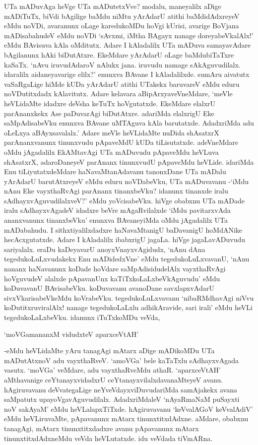 UTa mADuvAga heVge UTa mADutetxVve? modalu, maneyalilx aDige mADiTuTx, biVdi bAgilige baMdu niMtu yArAdarU atithi baMdidAdxreyeV eMdu noVDi, avaranunx oLage karedukoMDu hoVgi kUrisi, avarige BoVjana mADisabahudeV eMdu noVDi `sAvxmi, iMtha BAgayx nanage doreyabeVkalAlx!' eMdu BAvisuva kAla oMditutx. Adare I kAladalilx UTa mADuva samayavAdare bAgilanunx hAki biDutAtxre. EkeMdare yArAdarU oLage baMdubiTaTxre kaSaTx. `nAvu iruvudAdaroV nAlukx jana. iruvudu namage sAkAguvudilalx. idaralilx aidaneyavarige elilx?' enunxva BAvane I kAladalilxde. sumAru aivatutx vaSaRgaLige hiMde kUDa yArAdarU atithi UTakekx baruvareV eMdu eduru noVDutitxdadx kAlavitutx. Adare kelavara aBipArxyaveVneMdare, `meVle heVLidaMte idadxre deVsha keTuTx hoVgutatxde. EkeMdare elalxrU parAnanxkekx Ase paDuvarAgi biDutAtxre. adariMda elalxrigU Eke saMpAdisabeVku enunxva BAvane uMTAguva kAla barutatxde. AdadxriMda adu oLeLxya aBAyxsavalalx.' Adare meVle heVLidaMte nuDida shAsatxrX parAnanxvanunx tinunxvudu pApaveMdU kUDa tiLisutatxde. adeVneMdare oMdu jAgadalilx EkAMtavAgi UTa mADuvudu pApaveMdu heVLuva shAsatxrX, adaroDaneyeV parAnanx tinunxvudU pApaveMdu heVLide. idariMda Enu tiLiyutatxdeMdare haNavaMtanAdavanu tanonxDane UTa mADalu yArAdarU barutAtxreyeV eMdu eduru noVDabeVku, UTa mADuvavanu -`iMdu nAnu Eke vayxthaRvAgi parAnanx tinanxbeVku? idanunx tinanxde iralu sAdhayxvAguvudilalxveV?' eMdu yoVcisabeVku. hiVge obabxnu UTa mADade iralu sAdhayxvAgadeV idadxre beVre mAgaRvilalxde `iMdu pavitarxvAda ananxvanunx tinanxbeVku' enunxva BAvaneyiMda oMdu jAgadalilx UTa mADabahudu. I sithxtiyalilxdadxre haNavaMtanigU baDavanigU hoMdANike hecAcxgutatxde. Adare I kAladalilx ibabxrigU jagaLa. hiVge jagaLavADuvudu sariyalalx. eraDu kaDeyavarU anoyxVnayxvAgidudx, `nAnu dAna tegedukoLuLxvudakekx Enu mADidedxVne' eMdu tegedukoLuLxvavanU, `nAnu nananx haNavanunx koDade hoVdare saMpAdisidudelAlx vayxthaRvAgi hoVguvudeV alalxde pApavanUnx kaTiTxkoLaLxbeVkAguvudu' eMdu koDuvavanU BAvisabeVku. koDuvavanu avanoDane savxlapxvAdarU sivxVkarisabeVkeMdu koVrabeVku. tegedukoLuLxvavanu `nibaRMdhavAgi niVvu koDutitxruviralAlx! nanage tegedukoLaLxlu adhikAravide, sari irali' eMdu heVLi tegedukoLaLxbeVku. idanunx iTuTxkoMDu veVda,

\begin{shloka}
`moVGamananxM vidudxteV aparxceVtAH'
\end{shloka}

-eMdu heVLidaMte yAru tanagAgi mAtarx aDige mADikoMDu UTa mADutAtxnoV adu vayxthaRveV. `amoVGa' bele kaTaTxlu sAdhayxvAgada vasutx. `moVGa' veMdare, adu vayxthaRveMdu athaR. `aparxceVtAH' aMthavanige ceYtanayxvidadxrU ceYtanayxvilalxdavanaMteyeV avanu. hAgiruvavanu deVvategaLige neYveVdayxviDuvudariMda samAjakekx avana saMpatutx upayoVgavAguvudilalx. AdadxriMdaleV `nAyaRmaNaM puSayxti noV sakAyaM' eMdu heVLalapxTiTxde. hAgiruvavanu `keVvalAGoV keVvalAdiV' eMdu heVLiruvaMte, pApavanunx mAtarx tinunxtitxdAdxne. aMdare, obabxnu tanagAgi, mAtarx tinunxtitxdadxre avanu pApavanunx mAtarx tinunxtitxdAdxneMdu veVda heVLutatxde. idu veVdada tiVmARna.

